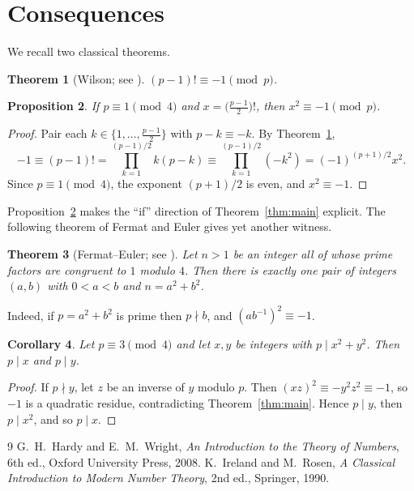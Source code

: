 \documentclass[11pt]{amsart}
\newtheorem{theorem}{Theorem}[section]
\newtheorem{proposition}[theorem]{Proposition}
\newtheorem{corollary}[theorem]{Corollary}
\theoremstyle{definition}
\theoremstyle{remark}
\begin{document}
\section{Consequences}

We recall two classical theorems.

\begin{theorem}[Wilson; see {\cite[Thm.~80]{HW}}]\label{thm:wilson}
$(p-1)!\equiv -1 \pmod p$.
\end{theorem}

\begin{proposition}\label{prop:factorial}
If $p\equiv 1 \pmod 4$ and $x=\bigl(\tfrac{p-1}{2}\bigr)!$, then
$x^2\equiv -1\pmod p$.
\end{proposition}

\begin{proof}
Pair each $k\in\{1,\dots,\frac{p-1}{2}\}$ with $p-k\equiv-k$. By
Theorem~\ref{thm:wilson},
\[
-1\equiv(p-1)! = \prod_{k=1}^{(p-1)/2} k(p-k)\equiv\prod_{k=1}^{(p-1)/2}(-k^2)
= (-1)^{(p+1)/2}x^2 .
\]
Since $p\equiv1\pmod4$, the exponent $(p+1)/2$ is even, and $x^2\equiv-1$.
\end{proof}

Proposition~\ref{prop:factorial} makes the ``if'' direction of
Theorem~\ref{thm:main} explicit. The following theorem of Fermat and Euler
gives yet another witness.

\begin{theorem}[Fermat--Euler; see {\cite[Ch.~XX]{HW}}]\label{thm:twosq}
Let $n>1$ be an integer all of whose prime factors are congruent to $1$
modulo $4$. Then there is exactly one pair of integers $(a,b)$ with
$0<a<b$ and $n=a^2+b^2$.
\end{theorem}

Indeed, if $p=a^2+b^2$ is prime then $p\nmid b$, and $(ab^{-1})^2\equiv-1$.

\begin{corollary}\label{cor:div}
Let $p\equiv3\pmod 4$ and let $x,y$ be integers with $p\mid x^2+y^2$. Then
$p\mid x$ and $p\mid y$.
\end{corollary}

\begin{proof}
If $p\nmid y$, let $z$ be an inverse of $y$ modulo $p$. Then
$(xz)^2\equiv -y^2z^2\equiv-1$, so $-1$ is a quadratic residue, contradicting
Theorem~\ref{thm:main}. Hence $p\mid y$, then $p\mid x^2$, and so $p\mid x$.
\end{proof}

\begin{thebibliography}{9}
 G.~H.~Hardy and E.~M.~Wright, \emph{An Introduction to the Theory
of Numbers}, 6th ed., Oxford University Press, 2008.
 K.~Ireland and M.~Rosen, \emph{A Classical Introduction to Modern
Number Theory}, 2nd ed., Springer, 1990.
\end{thebibliography}
\end{document}
